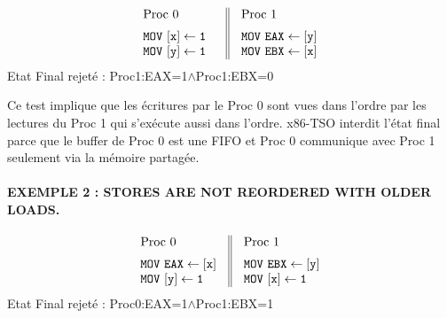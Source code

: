 \documentclass[12pt,a4paper]{article}
\begin{document}
\begin{center}
\[
\begin{array}{c||c}
  \begin{array}{l}
  	\vspace{0.2cm}
    \text{Proc 0} \hspace{1.0cm}\\
    \mathtt{MOV \text{ } [x] \leftarrow 1} \\
    \mathtt{MOV \text{ } [y] \leftarrow 1} \\
  \end{array}&
  \begin{array}{l}
  \vspace{0.2cm}
   \text{Proc 1} \\
    \mathtt{MOV \text{ } EAX \leftarrow [y]} \\
    \mathtt{MOV \text{ } EBX \leftarrow [x]} \\
  \end{array}
\end{array}
\]
Etat Final rejeté : Proc1:EAX=1$\land$Proc1:EBX=0
\end{center}

Ce test implique que les écritures par le Proc 0 sont vues dans l'ordre par les lectures du Proc 1 qui s'exécute aussi dans l'ordre. x86-TSO interdit l'état final parce que le buffer de Proc 0 est une FIFO et Proc 0 communique avec Proc 1 seulement via  la mémoire partagée.

\paragraph{EXEMPLE 2 : STORES ARE NOT REORDERED WITH OLDER LOADS.}

\begin{center}
\[
\begin{array}{c||c}
  \begin{array}{l}
  	\vspace{0.2cm}
    \text{Proc 0} \hspace{1.0cm}\\
    \mathtt{MOV \text{ } EAX \leftarrow [x]} \\
    \mathtt{MOV \text{ } [y] \leftarrow 1} \\
  \end{array}&
  \begin{array}{l}
  \vspace{0.2cm}
   \text{Proc 1} \\
    \mathtt{MOV \text{ } EBX \leftarrow [y]} \\
    \mathtt{MOV \text{ } [x] \leftarrow 1} \\
  \end{array}
\end{array}
\]
Etat Final rejeté : Proc0:EAX=1$\land$Proc1:EBX=1
\end{center}  
\end{document}
